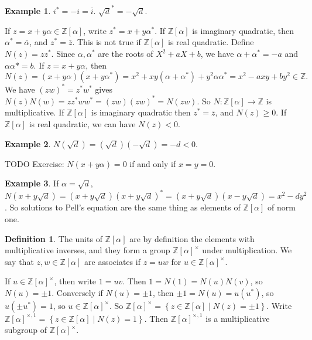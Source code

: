 \documentclass{article}
\newcommand{\Z}{\mathbb{Z}}
\newcommand{\rb}[1]{\left( #1 \right)}
\renewcommand{\sb}[1]{\left[ #1 \right]}
\newcommand{\cb}[1]{\left\{ #1 \right\}}
\theoremstyle{definition}\newtheorem{definition}{Definition}
\theoremstyle{definition}\newtheorem*{remark}{Remark}
\theoremstyle{definition}\newtheorem*{example}{Example}
\theoremstyle{definition}\newtheorem*{note}{Note}
\begin{document}
\begin{example}
$ i^* = -i = \bar{i} $. $ \sqrt{d}^* = -\sqrt{d} $.
\end{example}

If $ z = x + y\alpha \in \Z\sb{\alpha} $, write $ z^* = x + y\alpha^* $. If $ \Z\sb{\alpha} $ is imaginary quadratic, then $ \alpha^* = \bar{\alpha} $, and $ z^* = \bar{z} $. This is not true if $ \Z\sb{\alpha} $ is real quadratic. Define $ N\rb{z} = zz^* $. Since $ \alpha, \alpha^* $ are the roots of $ X^2 + aX + b $, we have $ \alpha + \alpha^* = -a $ and $ \alpha\alpha* = b $. If $ z = x + y\alpha $, then
$$ N\rb{z} = \rb{x + y\alpha}\rb{x + y\alpha^*} = x^2 + xy\rb{\alpha + \alpha^*} + y^2\alpha\alpha^* = x^2 - axy + by^2 \in \Z. $$
We have $ \rb{zw}^* = z^*w^* $ gives $ N\rb{z}N\rb{w} = zz^*ww^* = \rb{zw}\rb{zw}^* = N\rb{zw} $. So $ N : \Z\sb{\alpha} \to \Z $ is multiplicative. If $ \Z\sb{\alpha} $ is imaginary quadratic then $ z^* = \bar{z} $, and $ N\rb{z} \ge 0 $. If $ \Z\sb{\alpha} $ is real quadratic, we can have $ N\rb{z} < 0 $.

\begin{example}
$ N\rb{\sqrt{d}} = \rb{\sqrt{d}}\rb{-\sqrt{d}} = -d < 0 $.
\end{example}

TODO Exercise: $ N\rb{x + y\alpha} = 0 $ if and only if $ x = y = 0 $.

\begin{example}
If $ \alpha = \sqrt{d} $, $ N\rb{x + y\sqrt{d}} = \rb{x + y\sqrt{d}}\rb{x + y\sqrt{d}}^* = \rb{x + y\sqrt{d}}\rb{x - y\sqrt{d}} = x^2 - dy^2 $. So solutions to Pell's equation are the same thing as elements of $ \Z\sb{\alpha} $ of norm one.
\end{example}

\begin{definition}
The units of $ \Z\sb{\alpha} $ are by definition the elements with multiplicative inverses, and they form a group $ \Z\sb{\alpha}^\times $ under multiplication. We say that $ z, w \in \Z\sb{\alpha} $ are associates if $ z = uw $ for $ u \in \Z\sb{\alpha}^\times $.
\end{definition}

If $ u \in \Z\sb{\alpha}^\times $, then write $ 1 = uv $. Then $ 1 = N\rb{1} = N\rb{u}N\rb{v} $, so $ N\rb{u} = \pm 1 $. Conversely if $ N\rb{u} = \pm 1 $, then $ \pm 1 = N\rb{u} = u\rb{u^*} $, so $ u\rb{\pm u^*} = 1 $, so $ u \in \Z\sb{\alpha}^\times $. So $ \Z\sb{\alpha}^\times = \cb{z \in \Z\sb{\alpha} \mid N\rb{z} = \pm 1} $. Write $ \Z\sb{\alpha}^{\times, 1} = \cb{z \in \Z\sb{\alpha} \mid N\rb{z} = 1} $. Then $ \Z\sb{\alpha}^{\times, 1} $ is a multiplicative subgroup of $ \Z\sb{\alpha}^\times $.
\end{document}
